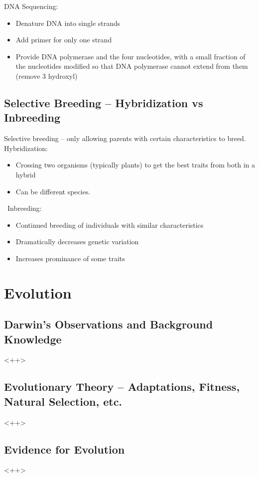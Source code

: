 \documentclass{article}
\begin{document}
DNA Sequencing:
\begin{itemize}
\item Denature DNA into single strands
\item Add primer for only one strand
\item Provide DNA polymerase and the four nucleotides, with a small fraction of the nucleotides modified so that DNA polymerase cannot extend from them (remove 3 hydroxyl)
\end{itemize}

\subsection{Selective Breeding -- Hybridization vs Inbreeding}

Selective breeding -- only allowing parents with certain characteristics to breed.\\
Hybridization:
\begin{itemize}
\item Crossing two organisms (typically plants) to get the best traits from both in a hybrid
\item Can be different species.
\end{itemize}\
Inbreeding:
\begin{itemize}
\item Continued breeding of individuals with similar characteristics
\item Dramatically decreases genetic variation
\item Increases prominance of some traits
\end{itemize}

\section{Evolution}

\subsection{Darwin's Observations and Background Knowledge}
<++>

\subsection{Evolutionary Theory -- Adaptations, Fitness, Natural Selection, etc.}
<++>

\subsection{Evidence for Evolution}
<++>
\end{document}
